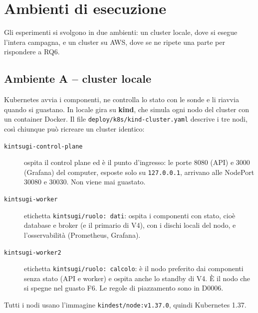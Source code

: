 \chapter{Ambienti di esecuzione}
\label{cap:deployment}

Gli esperimenti si svolgono in due ambienti: un cluster locale, dove si esegue l'intera campagna, e un cluster su AWS, dove se ne ripete una parte per rispondere a RQ6.

\section{Ambiente A -- cluster locale}

Kubernetes avvia i componenti, ne controlla lo stato con le sonde e li riavvia quando si guastano. In locale gira su \textbf{kind}, che simula ogni nodo del cluster con un container Docker. Il file \texttt{deploy/k8s/kind-cluster.yaml} descrive i tre nodi, così chiunque può ricreare un cluster identico:

\begin{description}
  \item[\texttt{kintsugi-control-plane}] ospita il control plane ed è il punto d'ingresso: le porte 8080 (API) e 3000 (Grafana) del computer, esposte solo su \texttt{127.0.0.1}, arrivano alle NodePort 30080 e 30030. Non viene mai guastato.
  \item[\texttt{kintsugi-worker}] etichetta \texttt{kintsugi/ruolo: dati}: ospita i componenti con stato, cioè database e broker (e il primario di V4), con i dischi locali del nodo, e l'osservabilità (Prometheus, Grafana).
  \item[\texttt{kintsugi-worker2}] etichetta \texttt{kintsugi/ruolo: calcolo}: è il nodo preferito dai componenti senza stato (API e worker) e ospita anche lo standby di V4. È il nodo che si spegne nel guasto F6. Le regole di piazzamento sono in D0006.
\end{description}

Tutti i nodi usano l'immagine \texttt{kindest/node:v1.37.0}, quindi Kubernetes 1.37.

